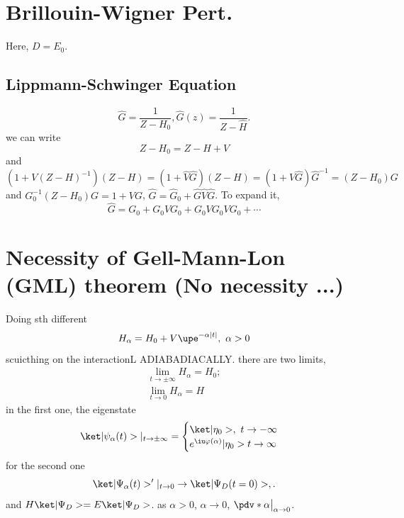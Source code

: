 \section{Brillouin-Wigner Pert.}

Here, $D = E_0$.

\subsection{Lippmann-Schwinger Equation}

\[
  \hat G = \frac{1}{Z - H_0}, \hat G(z) = \frac1{Z - \hat H}.
\]
we can write
\[
  Z - H_0 = Z - H + V
\]
and
\[
  (1 + V(Z - H)^{-1}) (Z - H) = (1 + \hat V \hat G)(Z - H) = (1 + \hat V \hat G) \hat G^{-1} = (Z - H_0) G
\]
and $G_0^{-1} (Z - H_0) G = 1 + VG$, $\hat G = \hat G_0 + \hat G \hat V \hat G$.
To expand it,
\[
  \hat G = G_0 + G_0 V G_0 + G_0 V G_0 V G_0 + \cdots
\]

\section{Necessity of Gell-Mann-Lon (GML) theorem (No necessity ...)}

Doing sth different
\begin{equation}
  H_\alpha = H_0 + V \upe^{-\alpha |t|}, ~ \alpha > 0
\end{equation}
scuicthing on the interactionL ADIABADIACALLY.
there are two limits,
\begin{gather}
  \lim_{t \to \pm\infty} H_\alpha = H_0;\\
  \lim_{t \to 0} H_\alpha = H
\end{gather}
in the first one, the eigenstate
\[
  \ket|\psi_\alpha(t)> |_{t \to \pm\infty} =
  \begin{cases}
    \ket|\eta_0>, ~ t \to -\infty\\
    e^{\iu\varphi(\alpha)} |\eta_0> t \to \infty
  \end{cases}
\]
for the second one
\[
  \ket|\Psi_\alpha(t)>'|_{t\to0} \to \ket|\Psi_D(t = 0)>,.
\]
and $H\ket|\Psi_D> = E\ket|\Psi_D>$.
as $\alpha > 0$, $\alpha \to 0$, $\pdv*{}\alpha \big|_{\alpha \to 0}$.

